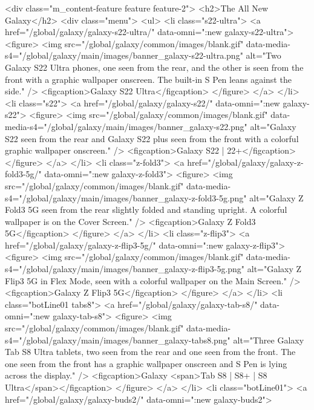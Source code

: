 {{{{{{{{{{{{{{{{{{{{{{{{{{{{{{{{{{{{{{{{{{{{{{{{{{{{{		<div class="m_content-feature feature feature-2">
			<h2>The All New Galaxy</h2>
			<div class="menu">
				<ul>
					<li class="s22-ultra">
						<a href="/global/galaxy/galaxy-s22-ultra/" data-omni=":new galaxy-s22-ultra">
							<figure>
								<img src="/global/galaxy/common/images/blank.gif" data-media-s4="/global/galaxy/main/images/banner_galaxy-s22-ultra.png" alt="Two Galaxy S22 Ultra phones, one seen from the rear, and the other is seen from the front with a graphic wallpaper onscreen. The built-in S Pen leans against the side." />
								<figcaption>Galaxy S22 Ultra</figcaption>
							</figure>
						</a>
					</li>
					<li class="s22">
						<a href="/global/galaxy/galaxy-s22/" data-omni=":new galaxy-s22">
							<figure>
								<img src="/global/galaxy/common/images/blank.gif" data-media-s4="/global/galaxy/main/images/banner_galaxy-s22.png" alt="Galaxy S22 seen from the rear and Galaxy S22 plus seen from the front with a colorful graphic wallpaper onscreen." />
								<figcaption>Galaxy S22 | 22+</figcaption>
							</figure>
						</a>
					</li>
					<li class="z-fold3">
						<a href="/global/galaxy/galaxy-z-fold3-5g/" data-omni=":new galaxy-z-fold3">
							<figure>
								<img src="/global/galaxy/common/images/blank.gif" data-media-s4="/global/galaxy/main/images/banner_galaxy-z-fold3-5g.png" alt="Galaxy Z Fold3 5G seen from the rear slightly folded and standing upright. A colorful wallpaper is on the Cover Screen." />
								<figcaption>Galaxy Z Fold3 5G</figcaption>
							</figure>
						</a>
					</li>
					<li class="z-flip3">
						<a href="/global/galaxy/galaxy-z-flip3-5g/" data-omni=":new galaxy-z-flip3">
							<figure>
								<img src="/global/galaxy/common/images/blank.gif" data-media-s4="/global/galaxy/main/images/banner_galaxy-z-flip3-5g.png" alt="Galaxy Z Flip3 5G in Flex Mode, seen with a colorful wallpaper on the Main Screen." />
								<figcaption>Galaxy Z Flip3 5G</figcaption>
							</figure>
						</a>
					</li>
					<li class="botLine01 tabs8">
						<a href="/global/galaxy/galaxy-tab-s8/" data-omni=":new galaxy-tab-s8">
							<figure>
								<img src="/global/galaxy/common/images/blank.gif" data-media-s4="/global/galaxy/main/images/banner_galaxy-tabs8.png" alt="Three Galaxy Tab S8 Ultra tablets, two seen from the rear and one seen from the front. The one seen from the front has a graphic wallpaper onscreen and S Pen is lying across the display." />
								<figcaption>Galaxy <span>Tab S8 | S8+ | S8 Ultra</span></figcaption>
							</figure>
						</a>
					</li>
					<li class="botLine01">
						<a href="/global/galaxy/galaxy-buds2/" data-omni=":new galaxy-buds2">
}}}}}}}}}}}}}}}}}}}}}}}}}}}}}}}}}}}}}}}}}}}}}}}}}}}}}

